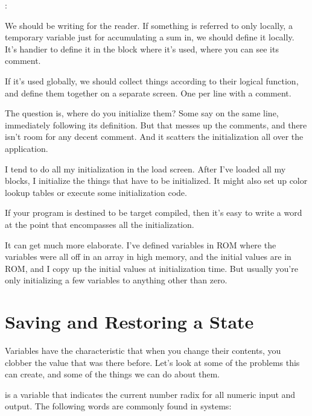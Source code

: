 \begin{interview}
:

\begin{tfquot}
We should be writing for the reader. If something is referred to only locally,
a temporary variable just for accumulating a sum in, we should define it
locally. It's handier to define it in the block where it's used, where you can
see its comment.

If it's used globally, we should collect things according to their logical
function, and define them together on a separate screen. One per line with a
comment.

The question is, where do you initialize them? Some say on the same line,
immediately following its definition. But that messes up the comments,
and there isn't room for any decent comment. And it scatters the
initialization all over the application.

I tend to do all my initialization in the load screen. After I've loaded all my
blocks, I initialize the things that have to be initialized. It might also set
up color lookup tables or execute some initialization code.

If your program is destined to be target compiled, then it's easy to write a
word at the point that encompasses all the initialization.

It can get much more elaborate. I've defined variables in ROM where the
variables were all off in an array in high memory, and the initial values are
in ROM, and I copy up the initial values at initialization time. But usually
you're only initializing a few variables to anything other than zero.
\end{tfquot}
\end{interview}

\section{Saving and Restoring a State}

Variables have the characteristic that when you change their contents,
you clobber the value that was there before. Let's look at some of the
problems this can create, and some of the things we can do about them.

 is a variable that indicates the current
number radix for all numeric input and output. The following words are
commonly found in \Forth{} systems:


